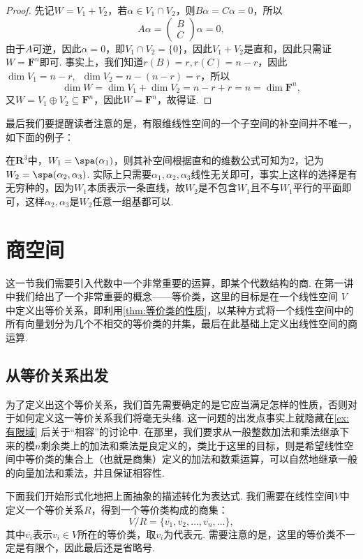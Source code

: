 \begin{proof}
    先记$W=V_1+V_2$，若$\alpha\in V_1\cap V_2$，则$B\alpha=C\alpha=0$，所以
    \[A\alpha=\begin{pmatrix}
            B \\
            C
        \end{pmatrix}\alpha=0,\]
    由于$A$可逆，因此$\alpha=0$，即$V_1\cap V_2=\{0\}$，因此$V_1+V_2$是直和，因此只需证$W=\mathbf{F}^n$即可. 事实上，我们知道$r(B)=r,r(C)=n-r$，因此$\dim V_1=n-r,\enspace \dim V_2=n-(n-r)=r$，所以
    \[\dim W=\dim V_1+\dim V_2=n-r+r=n=\dim \mathbf{F}^n,\]
    又$W=V_1\oplus V_2\subseteq \mathbf{F}^n$，因此$W=\mathbf{F}^n$，故得证.
\end{proof}

最后我们要提醒读者注意的是，有限维线性空间的一个子空间的补空间并不唯一，如下面的例子：
\begin{example}{}{}
    在$\mathbf{R}^3$中，$W_1=\spa(\alpha_1)$，则其补空间根据直和的维数公式可知为2，记为$W_2=\spa(\alpha_2,\alpha_3)$. 实际上只需要$\alpha_1,\alpha_2,\alpha_3$线性无关即可，事实上这样的选择是有无穷种的，因为$W_1$本质表示一条直线，故$W_2$是不包含$W_1$且不与$W_1$平行的平面即可，这样$\alpha_2,\alpha_3$是$W_2$任意一组基都可以.
\end{example}

\section{商空间}

这一节我们需要引入代数中一个非常重要的运算，即某个代数结构的商. 在第一讲中我们给出了一个非常重要的概念——等价类，这里的目标是在一个线性空间 $V$ 中定义出等价关系，即利用\autoref{thm:等价类的性质}，以某种方式将一个线性空间中的所有向量划分为几个不相交的等价类的并集，最后在此基础上定义出线性空间的商运算.

\subsection{从等价关系出发}

为了定义出这个等价关系，我们首先需要确定的是它应当满足怎样的性质，否则对于如何定义这一等价关系我们将毫无头绪. 这一问题的出发点事实上就隐藏在\autoref{ex:有限域} 后关于``相容''的讨论中. 在那里，我们要求从一般整数加法和乘法继承下来的模$n$剩余类上的加法和乘法是良定义的，类比于这里的目标，则是希望线性空间中等价类的集合上（也就是商集）定义的加法和数乘运算，可以自然地继承一般的向量加法和乘法，并且保证相容性.

下面我们开始形式化地把上面抽象的描述转化为表达式. 我们需要在线性空间$V$中定义一个等价关系$R$，得到一个等价类构成的商集：
\[V/R=\{\overline{v_1},\overline{v_2},\ldots,\overline{v_n},\ldots\},\]
其中$\overline{v_i}$表示$v_i\in V$所在的等价类，取$v_i$为代表元. 需要注意的是，这里的等价类不一定是有限个，因此最后还是省略号.

